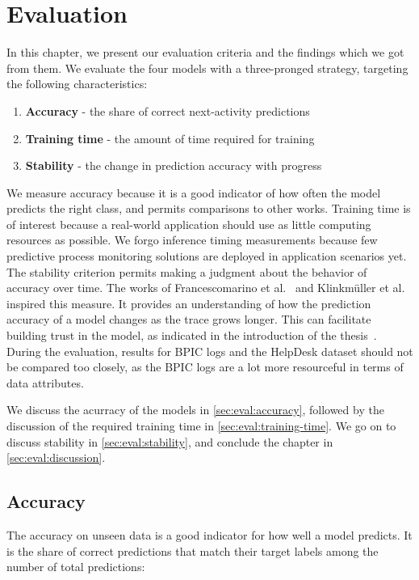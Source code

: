 \chapter{Evaluation}\label{chap:evaluation}
In this chapter, we present our evaluation criteria and the findings which we got from them.
We evaluate the four models with a three-pronged strategy, targeting the following characteristics:

\begin{enumerate}
    \item\textbf{Accuracy} - the share of correct next-activity predictions
    \item\textbf{Training time} - the amount of time required for training
    \item\textbf{Stability} - the change in prediction accuracy with progress
\end{enumerate}

We measure accuracy because it is a good indicator of how often the model predicts the right class, and permits comparisons to other works.
Training time is of interest because a real-world application should use as little computing resources as possible.
We forgo inference timing measurements because few predictive process monitoring solutions are deployed in application scenarios yet.
The stability criterion permits making a judgment about the behavior of accuracy over time. The works of Francescomarino et al.~\cite{francescomarino2015} and Klinkmüller et al.~\cite{klinkmuller2018reliablemonitoring} inspired this measure. It provides an understanding of how the prediction accuracy of a model changes as the trace grows longer. This can facilitate building trust in the model, as indicated in the introduction of the thesis~\cite{klinkmuller2018reliablemonitoring, boehmer2018probability}.
During the evaluation, results for BPIC logs and the HelpDesk dataset should not be compared too closely, as the BPIC logs are a lot more resourceful in terms of data attributes.

We discuss the acurracy of the models in \autoref{sec:eval:accuracy}, followed by the discussion of the required training time in \autoref{sec:eval:training-time}. We go on to discuss stability in \autoref{sec:eval:stability}, and conclude the chapter in \autoref{sec:eval:discussion}.

\section{Accuracy}\label{sec:eval:accuracy}
The accuracy on unseen data is a good indicator for how well a model predicts.
It is the share of correct predictions that match their target labels among the number of total predictions:


